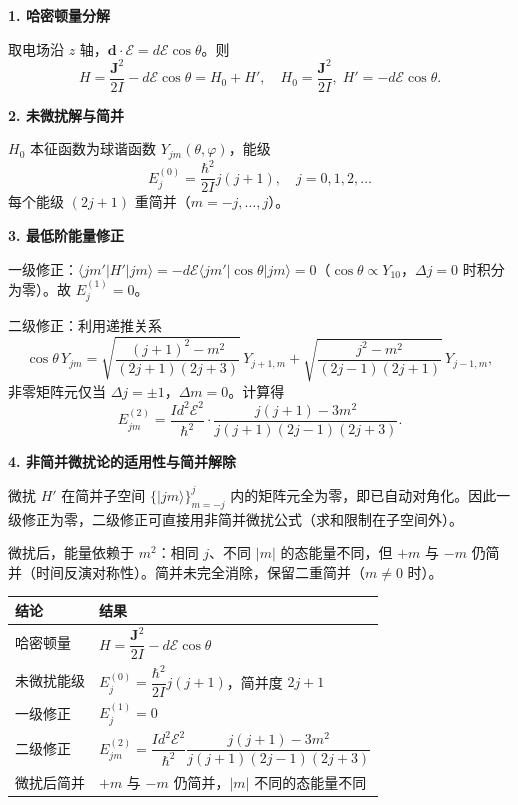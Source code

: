 \begin{derivationbox}[标准解题过程]
\textbf{1. 哈密顿量分解}

取电场沿 $z$ 轴，$\mathbf{d}\cdot\boldsymbol{\mathcal{E}}=d\mathcal{E}\cos\theta$。则
\[
H=\frac{\mathbf{J}^2}{2I}-d\mathcal{E}\cos\theta=H_0+H',\quad H_0=\frac{\mathbf{J}^2}{2I},\;H'=-d\mathcal{E}\cos\theta.
\]

\textbf{2. 未微扰解与简并}

$H_0$ 本征函数为球谐函数 $Y_{jm}(\theta,\varphi)$，能级
\[
E_j^{(0)}=\frac{\hbar^2}{2I}j(j+1),\quad j=0,1,2,\ldots
\]
每个能级 $(2j+1)$ 重简并（$m=-j,\ldots,j$）。

\textbf{3. 最低阶能量修正}

一级修正：$\langle jm'|H'|jm\rangle=-d\mathcal{E}\langle jm'|\cos\theta|jm\rangle=0$（$\cos\theta\propto Y_{10}$，$\Delta j=0$ 时积分为零）。故 $E_j^{(1)}=0$。

二级修正：利用递推关系
\[
\cos\theta\,Y_{jm}=\sqrt{\frac{(j+1)^2-m^2}{(2j+1)(2j+3)}}\,Y_{j+1,m}+\sqrt{\frac{j^2-m^2}{(2j-1)(2j+1)}}\,Y_{j-1,m},
\]
非零矩阵元仅当 $\Delta j=\pm1$，$\Delta m=0$。计算得
\begin{equation}
\boxed{E_{jm}^{(2)}=\frac{Id^2\mathcal{E}^2}{\hbar^2}\cdot\frac{j(j+1)-3m^2}{j(j+1)(2j-1)(2j+3)}.}
\end{equation}

\textbf{4. 非简并微扰论的适用性与简并解除}

微扰 $H'$ 在简并子空间 $\{|jm\rangle\}_{m=-j}^j$ 内的矩阵元全为零，即已自动对角化。因此一级修正为零，二级修正可直接用非简并微扰公式（求和限制在子空间外）。

微扰后，能量依赖于 $m^2$：相同 $j$、不同 $|m|$ 的态能量不同，但 $+m$ 与 $-m$ 仍简并（时间反演对称性）。简并未完全消除，保留二重简并（$m\neq0$ 时）。
\end{derivationbox}

\begin{formulabox}[答案汇总]
\begin{center}
\begin{tabular}{ll}
\toprule
\textbf{结论} & \textbf{结果} \\
\midrule
哈密顿量 & $H=\dfrac{\mathbf{J}^2}{2I}-d\mathcal{E}\cos\theta$ \\
未微扰能级 & $E_j^{(0)}=\dfrac{\hbar^2}{2I}j(j+1)$，简并度 $2j+1$ \\
一级修正 & $E_j^{(1)}=0$ \\
二级修正 & $E_{jm}^{(2)}=\dfrac{Id^2\mathcal{E}^2}{\hbar^2}\dfrac{j(j+1)-3m^2}{j(j+1)(2j-1)(2j+3)}$ \\
微扰后简并 & $+m$ 与 $-m$ 仍简并，$|m|$ 不同的态能量不同 \\
\bottomrule
\end{tabular}
\end{center}
\end{formulabox}

